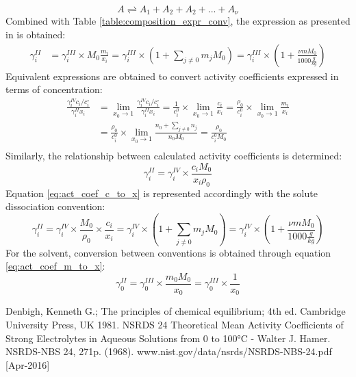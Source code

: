 \documentclass[onecolumn]{article}
\begin{document}
\[
A \rightleftharpoons A_1 + A_2 + A_2 + ... + A_{\nu}
\]
Combined with Table \ref{table:composition_expr_conv}, the expression as presented in \cite{Hamer1968} is obtained:
\[
\begin{aligned}
\gamma_i^{II} & =  \gamma_i^{III} \times M_0 \frac{m_i}{x_i} = \gamma_i^{III} \times (1+\sum_{j\neq0}{m_j M_0}) = \gamma_i^{III} \times \left(1+\frac{\nu m M_0}{1000 \frac{g}{kg}} \right)
\end{aligned}
\]
Equivalent expressions are obtained to convert activity coefficients expressed in terms of concentration:
\[
\begin{aligned}
\frac{\gamma_i^{IV} c_i/c_i^{\circ}}{\gamma_i^{II} x_i} & = \lim_{x_0 \to 1} \frac{\gamma_i^{IV} c_i/c_i^{\circ}}{\gamma_i^{II} x_i} = \frac{1}{c_i^0} \times \lim_{x_0 \to 1} \frac{c_i}{x_i} = \frac{\rho_0}{c_i^0} \times \lim_{x_0 \to 1} \frac{m_i}{x_i} \\ & = \frac{\rho_0}{c_i^0} \times \lim_{x_0 \to 1}\frac{n_0+\sum_{j \neq 0}n_j}{n_0 M_0} = \frac{\rho_0}{c_i^0 M_0}\\
\end{aligned}
\]
Similarly, the relationship between calculated activity coefficients is determined:
\begin{equation}
\label{eq:act_coef_c_to_x}
\gamma_i^{II} = \gamma_i^{IV} \times \frac{c_i M_0}{x_i \rho_0}
\end{equation}
Equation \ref{eq:act_coef_c_to_x} is represented accordingly with the solute dissociation convention:
\[
\gamma_i^{II} = \gamma_i^{IV} \times \frac{M_0}{\rho_0}\times \frac{c_i}{x_i} = \gamma_i^{IV} \times (1 + \sum_{j\neq0}{m_jM_0}) = \gamma_i^{IV} \times \left(1+\frac{\nu m M_0}{1000 \frac{g}{kg}} \right)
\]
For the solvent, conversion between conventions is obtained through equation
\ref{eq:act_coef_m_to_x}:
\[
\gamma_0^{II} = \gamma_0^{III} \times \frac{m_0 M_0}{x_0} =
\gamma_0^{III} \times \frac{1}{x_0}
\]
 \begin{thebibliography}{9}
  Denbigh, Kenneth G.; The principles of chemical equilibrium; 4th ed. Cambridge University Press, UK 1981.
  NSRDS 24 Theoretical Mean Activity Coefficients of Strong Electrolytes in Aqueous Solutions from 0 to 100°C - Walter J. Hamer. NSRDS-NBS 24, 271p. (1968). www.nist.gov/data/nsrds/NSRDS-NBS-24.pdf [Apr-2016]
 \end{thebibliography}
\end{document}
